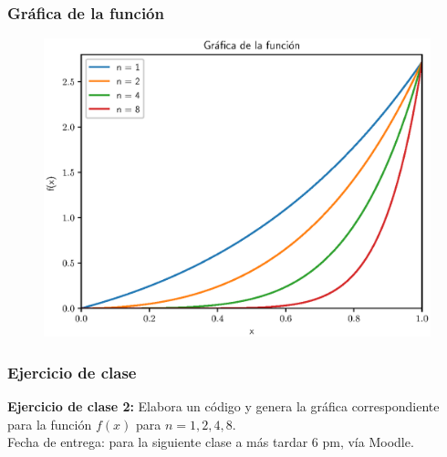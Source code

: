 \documentclass[12pt]{beamer}
\begin{document}
\begin{frame}
\frametitle{Gráfica de la función}
\begin{figure}
	\centering
	\includegraphics[scale=0.6]{Imagenes/Estabilidad_02.eps}
\end{figure}
\end{frame}
\begin{frame}
\frametitle{Ejercicio de clase}
\textbf{Ejercicio de clase 2:} Elabora un código y genera la gráfica correspondiente para la función $f(x)$ para $n = 1, 2, 4, 8$.
\\
\bigskip
\pause
Fecha de entrega: para la siguiente clase a más tardar 6 pm, vía Moodle.
\end{frame}




\end{document}
